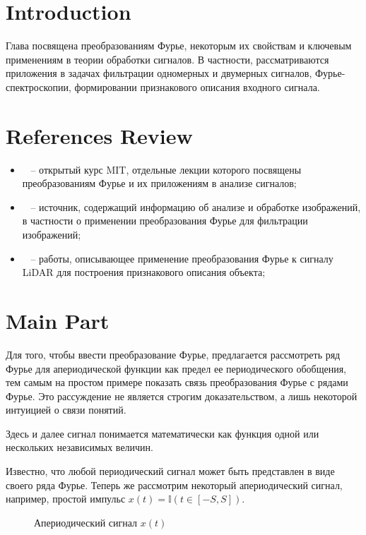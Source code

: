 \section{Introduction}

Глава посвящена преобразованиям Фурье, некоторым их свойствам и ключевым применениям в теории обработки сигналов. В частности, рассматриваются приложения в задачах фильтрации одномерных и двумерных сигналов, Фурье-спектроскопии, формировании признакового описания входного сигнала.

\section{References Review}

\begin{itemize}
    \item ~\cite{MITcourse} -- открытый курс MIT, отдельные лекции которого посвящены преобразованиям Фурье и их приложениям в анализе сигналов;
    \item ~\cite{GonzalezWoods} -- источник, содержащий информацию об анализе и обработке изображений, в частности о применении преобразования Фурье для фильтрации изображений;
    \item ~\cite{LiDAR1, LiDAR2} -- работы, описывающее применение преобразования Фурье к сигналу LiDAR для построения признакового описания объекта;
\end{itemize}

\section{Main Part}

Для того, чтобы ввести преобразование Фурье, предлагается рассмотреть ряд Фурье для апериодической функции как предел ее периодического обобщения, тем самым на простом примере показать связь преобразования Фурье с рядами Фурье. Это рассуждение не является строгим доказательством, а лишь некоторой интуицией о связи понятий.

Здесь и далее сигнал понимается математически как функция одной или нескольких независимых величин.

Известно, что любой периодический сигнал может быть представлен в виде своего ряда Фурье. 
Теперь же рассмотрим некоторый апериодический сигнал, например, простой импульс $x(t) = \mathbb{I}(t \in [-S, S])$. 
\begin{figure}[!htb]
\caption{Апериодический сигнал $x(t)$}
\end{figure}

